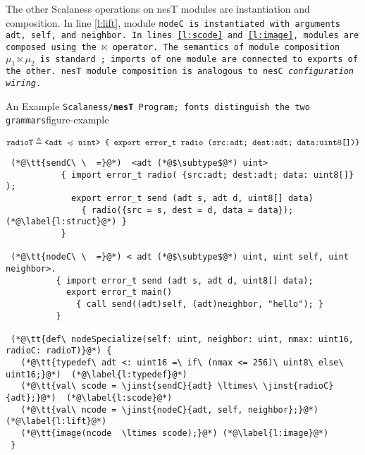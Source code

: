 The other Scalaness operations on nesT modules are instantiation and composition. In line
\ref{l:lift}, module \tt{nodeC} is instantiated with arguments \tt{adt}, \tt{self}, and
\tt{neighbor}. In lines \ref{l:scode} and \ref{l:image}, modules are composed using the
$\ltimes$ operator. The semantics of module composition $\mu_1 \ltimes \mu_2$ is standard
\cite{Cardelli-1997}; imports of one module are connected to exports of the other. nesT module
composition is analogous to nesC \emph{configuration
  wiring}.%
\begin{fpfig*}[t]{An Example \tt{Scalaness}/{\bf \texttt{nesT}} Program; fonts distinguish the two grammars}{figure-example}
\lstset{numbers=left, numberstyle=\tiny, stepnumber=1, numbersep=5pt, basicstyle=\ttfamily} 

{\scriptsize\bf
$$
\mathtt{radioT} \triangleq \texttt{<adt $\preccurlyeq$ uint> \{ export error\_t radio ({src:adt; dest:adt; data:uint8[]})\}} 
$$
\begin{lstlisting}
 (*@\tt{sendC\ \  =}@*)  <adt (*@$\subtype$@*) uint>  
           { import error_t radio( {src:adt; dest:adt; data: uint8[]} );       
             export error_t send (adt s, adt d, uint8[] data) 
               { radio({src = s, dest = d, data = data}); (*@\label{l:struct}@*) }
           }
 
 (*@\tt{nodeC\ \  =}@*) < adt (*@$\subtype$@*) uint, uint self, uint neighbor>.
          { import error_t send (adt s, adt d, uint8[] data); 
            export error_t main() 
              { call send((adt)self, (adt)neighbor, "hello"); }   
          }
 
 (*@\tt{def\ nodeSpecialize(self: uint, neighbor: uint, nmax: uint16, radioC: radioT)}@*) {
   (*@\tt{typedef\ adt <: uint16 =\ if\ (nmax <= 256)\ uint8\ else\ uint16;}@*)  (*@\label{l:typedef}@*)   
   (*@\tt{val\ scode = \jinst{sendC}{adt} \ltimes\ \jinst{radioC}{adt};}@*)  (*@\label{l:scode}@*)    
   (*@\tt{val\ ncode = \jinst{nodeC}{adt, self, neighbor};}@*) (*@\label{l:lift}@*)    
   (*@\tt{image(ncode  \ltimes scode);}@*) (*@\label{l:image}@*)   
 }
\end{lstlisting}}%
\end{fpfig*}


